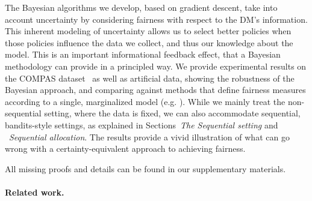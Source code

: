 The Bayesian algorithms we develop, based on gradient descent, take
into account uncertainty by considering fairness with respect to the
DM's information.  This inherent modeling of uncertainty allows us to
select better policies when those policies influence the data we
collect, and thus our knowledge about the model.  This is an important
informational feedback effect, that a Bayesian methodology can provide
in a principled way. We provide experimental results on the COMPAS
dataset~\citep{compas:dataset} as well as artificial data, showing the
robustness of the Bayesian approach, and comparing against methods that define fairness measures according to a single, marginalized model (e.g. \citep{HardtPNS16}). While we mainly treat the non-sequential setting, where the data is fixed, we can also accommodate sequential, bandits-style settings, as explained in Sections~\emph{The Sequential setting} and ~\emph{Sequential allocation}. The results provide a vivid
illustration of what can go wrong with a certainty-equivalent
approach to achieving fairness. 

All missing proofs and details can be found in our supplementary materials. 



\paragraph{Related work.}
%


